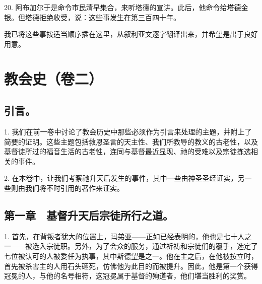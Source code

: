 20. 阿布加尔于是命令市民清早集合，来听塔德的宣讲。此后，他命令给塔德金银。但塔德拒绝收受，说：这些事发生在第三百四十年。\par

我已将这些事按适当顺序插在这里，从叙利亚文逐字翻译出来，并希望是出于良好用意。\par



\section{教会史（卷二）}


\subsection{引言。}

1. 我们在前一卷中讨论了教会历史中那些必须作为引言来处理的主题，并附上了简要的证明。这些主题包括救恩圣言的天主性、我们所教导的教义的古老性，以及基督徒所过的福音生活的古老性，连同与基督最近显现、祂的受难以及宗徒拣选相关的事件。\par

2. 在本卷中，让我们考察祂升天后发生的事件，其中一些由神圣圣经证实，另一些则由我们将不时引用的著作来证实。\par


\subsection{第一章　基督升天后宗徒所行之道。}

1. 首先，在背叛者犹大的位置上，玛弟亚——正如已经表明的，他也是七十人之一——被选入宗徒职。另外，为了会众的服务，通过祈祷和宗徒们的覆手，选定了七位被认可的人被委任为执事，其中斯德望是之一。他在主之后，在他被按立时，首先被杀害主的人用石头砸死，仿佛他为此目的而被提升。因此，他是第一个获得冠冕的人，与他的名号相符，这冠冕属于基督的殉道者，他们堪当胜利的奖赏。\par

